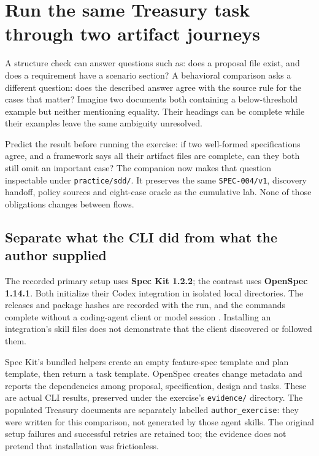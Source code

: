 \section{Run the same Treasury task through two artifact journeys}\label{sec:ch4-paired-practice}

A structure check can answer questions such as: does a proposal file exist, and does a requirement have a scenario section? A behavioral comparison asks a different question: does the described answer agree with the source rule for the cases that matter? Imagine two documents both containing a below-threshold example but neither mentioning equality. Their headings can be complete while their examples leave the same ambiguity unresolved.

Predict the result before running the exercise: if two well-formed specifications agree, and a framework says all their artifact files are complete, can they both still omit an important case? The companion now makes that question inspectable under \nolinkurl{practice/sdd/}. It preserves the same \texttt{SPEC-004/v1}, discovery handoff, policy sources and eight-case oracle as the cumulative lab. None of those obligations changes between flows.

\subsection{Separate what the CLI did from what the author supplied}

The recorded primary setup uses \textbf{Spec Kit 1.2.2}; the contrast uses \textbf{OpenSpec 1.14.1}. Both initialize their Codex integration in isolated local directories. The releases and package hashes are recorded with the run, and the commands complete without a coding-agent client or model session \parencite{sddSpecKit1222026,sddOpenSpec11412026}. Installing an integration's skill files does not demonstrate that the client discovered or followed them.

Spec Kit's bundled helpers create an empty feature-spec template and plan template, then return a task template. OpenSpec creates change metadata and reports the dependencies among proposal, specification, design and tasks. These are actual CLI results, preserved under the exercise's \texttt{evidence/} directory. The populated Treasury documents are separately labelled \texttt{author\_exercise}: they were written for this comparison, not generated by those agent skills. The original setup failures and successful retries are retained too; the evidence does not pretend that installation was frictionless.

